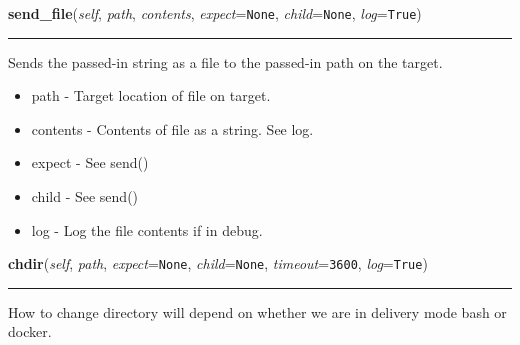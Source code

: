     \label{shutit_global:ShutIt:send_file}

    \vspace{0.5ex}

\hspace{.8\funcindent}\begin{boxedminipage}{\funcwidth}

    \raggedright \textbf{send\_file}(\textit{self}, \textit{path}, \textit{contents}, \textit{expect}={\tt None}, \textit{child}={\tt None}, \textit{log}={\tt True})

    \vspace{-1.5ex}

    \rule{\textwidth}{0.5\fboxrule}
\setlength{\parskip}{2ex}
    Sends the passed-in string as a file to the passed-in path on the 
    target.

    \begin{itemize}
    \setlength{\parskip}{0.6ex}
      \item path     - Target location of file on target.

      \item contents - Contents of file as a string. See log.

      \item expect   - See send()

      \item child    - See send()

      \item log      - Log the file contents if in debug.

    \end{itemize}

\setlength{\parskip}{1ex}
    \end{boxedminipage}

    \label{shutit_global:ShutIt:chdir}

    \vspace{0.5ex}

\hspace{.8\funcindent}\begin{boxedminipage}{\funcwidth}

    \raggedright \textbf{chdir}(\textit{self}, \textit{path}, \textit{expect}={\tt None}, \textit{child}={\tt None}, \textit{timeout}={\tt 3600}, \textit{log}={\tt True})

    \vspace{-1.5ex}

    \rule{\textwidth}{0.5\fboxrule}
\setlength{\parskip}{2ex}
    How to change directory will depend on whether we are in delivery mode 
    bash or docker.

\setlength{\parskip}{1ex}
    \end{boxedminipage}

